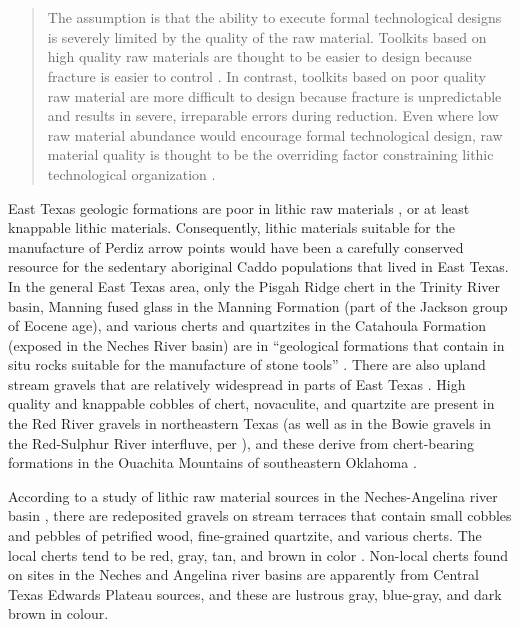 \documentclass[review]{elsarticle}
\begin{document}
\linenumbers

\section*{}

\begin{quote}
The assumption is that the ability to execute formal technological designs is severely limited by the quality of the raw material. Toolkits based on high quality raw materials are thought to be easier to design because fracture is easier to control \citep{RN4315,RN8924}. In contrast, toolkits based on poor quality raw material are more difficult to design because fracture is unpredictable and results in severe, irreparable errors during reduction. Even where low raw material abundance would encourage formal technological design, raw material quality is thought to be the overriding factor constraining lithic technological organization \citep[257]{RN5907}.
\end{quote}

East Texas geologic formations are poor in lithic raw materials \citep[Figure 2.1]{RN439}, or at least knappable lithic materials. Consequently, lithic materials suitable for the manufacture of Perdiz arrow points would have been a carefully conserved resource for the sedentary aboriginal Caddo populations that lived in East Texas. In the general East Texas area, only the Pisgah Ridge chert in the Trinity River basin, Manning fused glass in the Manning Formation (part of the Jackson group of Eocene age), and various cherts and quartzites in the Catahoula Formation (exposed in the Neches River basin) are in “geological formations that contain in situ rocks suitable for the manufacture of stone tools” \citep[49]{RN439}. There are also upland stream gravels that are relatively widespread in parts of East Texas \citep[56-57]{RN439}. High quality and knappable cobbles of chert, novaculite, and quartzite are present in the Red River gravels in northeastern Texas (as well as in the Bowie gravels in the Red-Sulphur River interfluve, per \citet{RN846}), and these derive from chert-bearing formations in the Ouachita Mountains of southeastern Oklahoma \citep[Figure 1.20]{RN439}.

According to a study of lithic raw material sources in the Neches-Angelina river basin \citet[69]{RN1253}, there are redeposited gravels on stream terraces that contain small cobbles and pebbles of petrified wood, fine-grained quartzite, and various cherts. The local cherts tend to be red, gray, tan, and brown in color \cite[66]{RN1253}. Non-local cherts found on sites in the Neches and Angelina river basins are apparently from Central Texas Edwards Plateau sources, and these are lustrous gray, blue-gray, and dark brown in colour.
\end{document}
